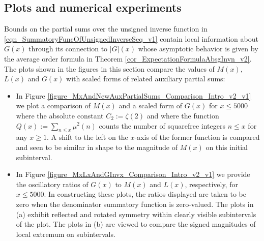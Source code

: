 \documentclass[11pt,reqno,a4letter]{article}
\newcommand{\hlocalref}[1]{\hyperref[#1]{\ref{#1}}}
\numberwithin{equation}{section}
\numberwithin{figure}{section}
\numberwithin{table}{section}
\theoremstyle{plain}
\numberwithin{theorem}{section}
\theoremstyle{definition}
\begin{document}
\subsection{Plots and numerical experiments}

Bounds on the partial sums over the unsigned inverse function in 
\eqref{eqn_SummatoryFuncOfUnsignedInverseSeq_v1} 
contain local information about $G(x)$ through its connection to $|G|(x)$ whose asymptotic 
behavior is given by the average order formula in 
Theorem \hlocalref{cor_ExpectationFormulaAbsgInvn_v2}. 
The plots shown in the figures in this section compare 
the values of $M(x)$, $L(x)$ and $G(x)$ with scaled forms of related auxiliary partial sums: 
\begin{itemize}[noitemsep,topsep=0pt,leftmargin=0.23in]

\item In Figure \hlocalref{figure_MxAndNewAuxPartialSums_Comparison_Intro_v2_v1} 
      we plot a comparison of $M(x)$ and a scaled form of $G(x)$ for $x \leq 5000$ where 
      the absolute constant $C_2 := \zeta(2)$ and where the function 
      $Q(x) := \sum_{n \leq x} \mu^2(n)$ counts the number of squarefree integers $n \leq x$ for any 
      $x \geq 1$. A shift to the left on the $x$-axis of the former function 
      is compared and seen to be similar in shape to the magnitude of $M(x)$ on this initial subinterval. 

\item In Figure \hlocalref{figure_MxLxAndGInvx_Comparison_Intro_v2_v1} we provide the oscillatory 
      ratios of $G(x)$ to $M(x)$ and $L(x)$, respectively, for $x \leq 5000$. 
      In constructing these plots, the ratios displayed are taken to be zero when the denominator 
      summatory function is zero-valued. 
      The plots in (a) exhibit reflected and rotated symmetry within 
      clearly visible subintervals of the plot.
      The plots in (b) are viewed to compare the signed magnitudes of local extremum 
      on subintervals. 


\end{itemize}
\end{document}
